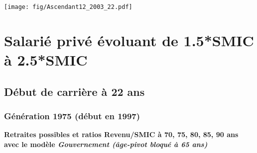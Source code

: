  \vspace{0.1cm} 

 \begin{center}\texttt{[image: fig/Ascendant12\_2003\_22.pdf]}\end{center} \label{fig/Ascendant12_2003_22.pdf} 

\newpage 
 
\chapter{Salarié privé évoluant de 1.5*SMIC à 2.5*SMIC} 


 \addto{\captionsenglish}{ \renewcommand{\mtctitle}{}} \setcounter{minitocdepth}{2} 
 \minitoc \newpage 

\section{Début de carrière à 22 ans} 

\subsection{Génération 1975 (début en 1997)} 

{\bf \noindent Retraites possibles et ratios Revenu/SMIC à 70, 75, 80, 85, 90 ans avec le modèle \emph{Gouvernement (âge-pivot bloqué à 65 ans)}}  
 
